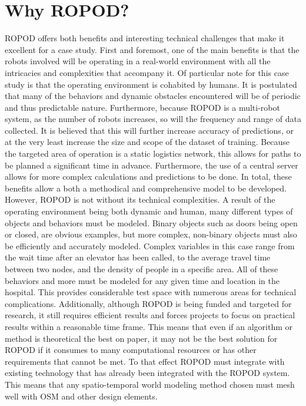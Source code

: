   \section{ Why ROPOD? }
  ROPOD offers both benefits and interesting technical
  challenges that make it excellent for a case study. First and
  foremost, one of the main benefits is that the robots involved will be
  operating in a real-world environment with all the intricacies and
  complexities that accompany it. Of particular note for this case study is
  that the operating environment is cohabited by humans. It is
  postulated that many of the behaviors and dynamic obstacles encountered
  will be of periodic and thus predictable nature. Furthermore, because ROPOD
  is a multi-robot system, as the number of robots increases, so will the
  frequency and range of data collected. It is believed that this
  will further increase accuracy of predictions, or at the very least increase
  the size and scope of the dataset of training. Because the targeted
  area of operation is a static logistics network, this allows for paths to be
  planned a significant time in advance. Furthermore, the use of a central
  server allows for more complex calculations and predictions to be done.
  In total, these benefits allow a both a methodical and comprehensive model
  to be developed. \\

  However, ROPOD is not without its technical complexities. A
  result of the operating environment being both dynamic and human, many
  different types of objects and behaviors must be modeled. Binary objects
  such as doors being open or closed, are obvious examples, but more
  complex, non-binary objects must also be efficiently and accurately modeled.
  Complex variables in this case range from the wait time after an elevator has been called,
  to the average travel time between two nodes, and the
  density of people in a specific area. All of these behaviors and more must be
  modeled for any given time and location in the hospital. This provides considerable
  test space with numerous areas for technical complications. Additionally,
  although ROPOD is being funded and targeted for research, it still requires
  efficient results and forces projects to focus on practical results within
  a reasonable time frame. This means that even if an algorithm or method
  is theoretical the best on paper, it may not be the best solution for ROPOD
  if it consumes to many computational resources or has other requirements that
  cannot be met. To that effect ROPOD must integrate
  with existing technology that has already been integrated with the ROPOD system. This
  means that any spatio-temporal world modeling method chosen must mesh well with OSM and other design
  elements. \\



